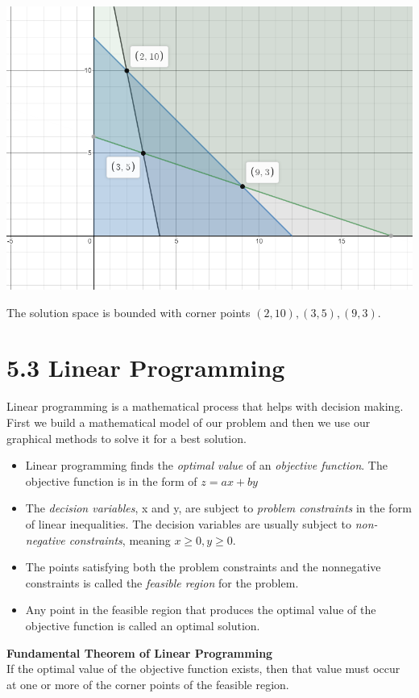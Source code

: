 \documentclass[14pt]{extarticle}
\begin{document}
\begin{center}
	\includegraphics[width=0.9\linewidth]{5-2-2}
\end{center}
The solution space is bounded with corner points $(2,10), (3,5), (9,3)$.

\cleardoublepage
\section*{5.3 Linear Programming}
Linear programming is a mathematical process that helps with decision making. First we build a mathematical model of our problem and then we use our graphical methods to solve it for a best solution.

\begin{itemize}
	\item Linear programming finds the \textit{optimal value} of an \textit{objective function}. The objective function is in the form of $z = ax + by$
	\item The \textit{decision variables}, x and y, are subject to \textit{problem constraints} in the form of linear inequalities. The decision variables are usually subject to \textit{non-negative constraints}, meaning $x \geq 0, y \geq0$.
	\item The points satisfying both the problem constraints and the nonnegative constraints is called the \textit{feasible region} for the problem.
	\item Any point in the feasible region that produces the optimal value of the objective function is called an optimal solution.
\end{itemize}

\begin{tcolorbox}[enhanced jigsaw,colback=bg,boxrule=0pt,arc=0pt]
	\textbf{Fundamental Theorem of Linear Programming}\\
	If the optimal value of the objective function exists, then that value must occur at one or more of the corner points of the feasible region.
\end{tcolorbox}
\end{document}
